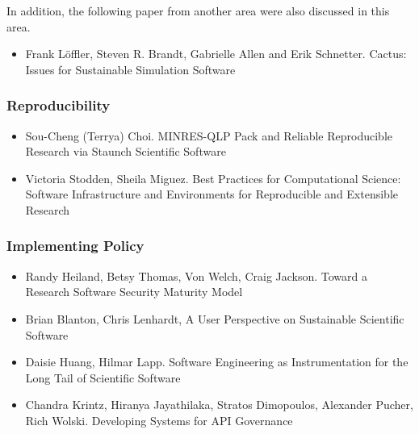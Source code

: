 \documentclass[11pt, oneside]{amsart}
\begin{document}
In addition, the following paper from another area were also discussed
in this area.

\begin{itemize}

\item Frank L\"{o}ffler, Steven R. Brandt, Gabrielle Allen and Erik
  Schnetter. Cactus: Issues for Sustainable Simulation Software~\cite{Loffler_WSSSPE}

\end{itemize}

\subsubsection*{Reproducibility}

\begin{itemize}

\item Sou-Cheng (Terrya) Choi. MINRES-QLP Pack and Reliable
  Reproducible Research via Staunch Scientific Software~\cite{Choi_WSSSPE}


\item Victoria Stodden, Sheila Miguez. Best Practices for
  Computational Science: Software Infrastructure and Environments for
  Reproducible and Extensible Research~\cite{Stodden_WSSSPE}

\end{itemize}

\subsubsection*{Implementing Policy}

\begin{itemize}

\item Randy Heiland, Betsy Thomas, Von Welch, Craig Jackson. Toward a
  Research Software Security Maturity Model~\cite{Heiland_WSSSPE}

\item Brian Blanton, Chris Lenhardt, A User Perspective on Sustainable
  Scientific Software~\cite{Blanton_WSSSPE}

\item Daisie Huang, Hilmar Lapp. Software Engineering as
  Instrumentation for the Long Tail of Scientific Software~\cite{Huang_WSSSPE}

\item Chandra Krintz, Hiranya Jayathilaka, Stratos
  Dimopoulos, Alexander Pucher, Rich Wolski. Developing Systems for API Governance~\cite{Krintz_WSSSPE}

\end{itemize}
\end{document}
